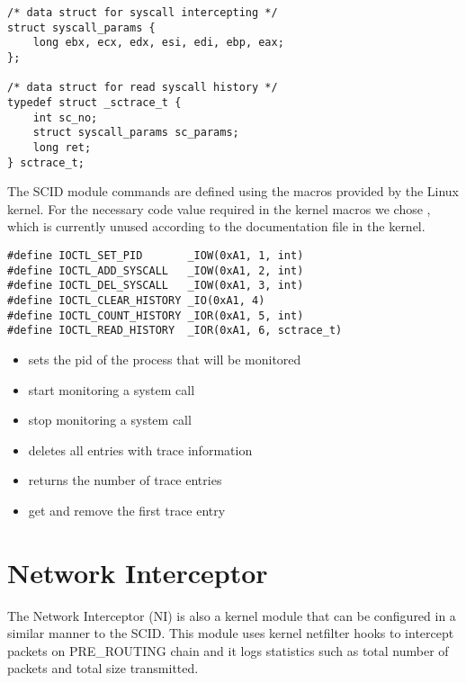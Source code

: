 \lstset{language=C,caption=SCID data structures,label=lst:scid-struct}
\begin{lstlisting}
/* data struct for syscall intercepting */
struct syscall_params {
	long ebx, ecx, edx, esi, edi, ebp, eax;
};

/* data struct for read syscall history */
typedef struct _sctrace_t {
	int sc_no;
	struct syscall_params sc_params;
	long ret;
} sctrace_t;
\end{lstlisting}

The SCID module  commands are defined using the macros provided by the Linux kernel. For the necessary code value required in the kernel macros we chose , which is currently unused according to the documentation file in the kernel.

\lstset{language=C,caption=Command macros for ioctl,label=lst:scid-ioctl}
\begin{lstlisting}
#define IOCTL_SET_PID		_IOW(0xA1, 1, int)
#define IOCTL_ADD_SYSCALL	_IOW(0xA1, 2, int)
#define IOCTL_DEL_SYSCALL	_IOW(0xA1, 3, int)
#define IOCTL_CLEAR_HISTORY	_IO(0xA1, 4)
#define IOCTL_COUNT_HISTORY	_IOR(0xA1, 5, int)
#define IOCTL_READ_HISTORY	_IOR(0xA1, 6, sctrace_t)
\end{lstlisting}

\begin{itemize}
	\item {} sets the pid of the process that will be monitored
	\item {} start monitoring a system call
	\item {} stop monitoring a system call
	\item {} deletes all entries with trace information
	\item {} returns the number of trace entries
	\item {} get and remove the first trace entry
\end{itemize}

\section{Network Interceptor}
\label{fourth:ni}

The Network Interceptor (NI) is also a kernel module that can be configured in a similar manner to the SCID. This module uses kernel netfilter hooks to intercept packets on PRE_ROUTING chain and it logs statistics such as total number of packets and total size transmitted.

